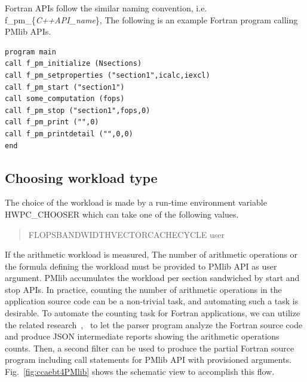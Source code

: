 \documentclass[conference]{IEEEtran}
\begin{document}
Fortran APIs follow the similar naming convention,
i.e. f\_pm\_\{{\footnotesize\it{C++API\_name}}\},
The following is an example Fortran program calling PMlib APIs.

\begin{lstlisting}
program main
call f_pm_initialize (Nsections)
call f_pm_setproperties ("section1",icalc,iexcl)
call f_pm_start ("section1")
call some_computation (fops)
call f_pm_stop ("section1",fops,0)
call f_pm_print ("",0)
call f_pm_printdetail ("",0,0)
end
\end{lstlisting}

%
\subsection{Choosing workload type}
\label{subsection:Choosing-workload-type}

The choice of the workload is made by a
run-time environment variable HWPC\_CHOOSER
which can take one of the following values.
\begin{quote}
\begin{small}
FLOPS\textbar BANDWIDTH\textbar VECTOR\textbar CACHE\textbar CYCLE%
\textbar user
\end{small}
\end{quote}

If the arithmetic workload is measured,
The number of arithmetic operations or the formula defining the workload
must be provided to PMlib API as user argument.
PMlib accumulates the workload per section sandwiched by start and stop APIs.
In practice, counting the number of arithmetic operations in the application
source code can be a non-trivial task, and automating such a task is desirable.
%
To automate the counting task for Fortran applications, we can utilize
the related research~\cite{Hoshimoto:2015},~\cite{ccaebt:HPCAsia2018}
to let the parser program analyze the Fortran source code
and produce JSON intermediate reports showing the arithmetic operations counts.
Then, a second filter can be used to produce the partial Fortran source program
including call statements for PMlib API with provisioned arguments.
Fig.~\ref{fig:ccaebt4PMlib} shows the schematic view to accomplish this flow.
\end{document}
